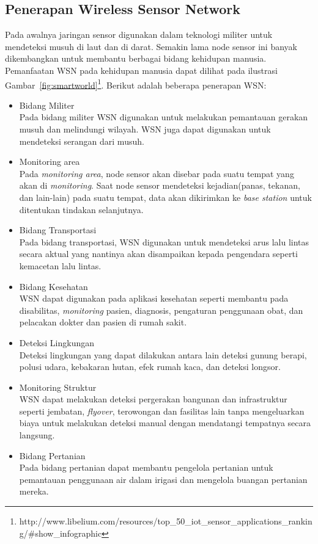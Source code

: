 \subsection{Penerapan Wireless Sensor Network \cite{handbook}}
Pada awalnya jaringan sensor digunakan dalam teknologi militer untuk mendeteksi musuh di laut dan di darat. Semakin lama node sensor ini banyak dikembangkan untuk membantu berbagai bidang kehidupan manusia. Pemanfaatan WSN pada kehidupan manusia dapat dilihat pada ilustrasi Gambar~\ref{fig:smartworld}\footnote{http://www.libelium.com/resources/top\_50\_iot\_sensor\_applications\_ranking/\#show\_infographic}. Berikut adalah beberapa penerapan WSN:
\begin{itemize}
\item Bidang Militer\\
Pada bidang militer WSN digunakan untuk melakukan pemantauan gerakan musuh dan melindungi wilayah. WSN juga dapat digunakan untuk mendeteksi serangan dari musuh.

\item Monitoring area\\
Pada \textit{monitoring area}, node sensor akan disebar pada suatu tempat yang akan di \textit{monitoring}. Saat node sensor mendeteksi kejadian(panas, tekanan, dan lain-lain) pada suatu tempat, data akan dikirimkan ke \textit{base station} untuk ditentukan tindakan selanjutnya.

\item Bidang Transportasi\\
Pada bidang transportasi, WSN digunakan untuk mendeteksi arus lalu lintas secara aktual yang nantinya akan disampaikan kepada pengendara seperti kemacetan lalu lintas. 

\item Bidang Kesehatan\\
WSN dapat digunakan pada aplikasi kesehatan seperti membantu pada disabilitas, \textit{monitoring} pasien, diagnosis, pengaturan penggunaan obat, dan pelacakan dokter dan pasien di rumah sakit.

\item Deteksi Lingkungan\\
Deteksi lingkungan yang dapat dilakukan antara lain deteksi gunung berapi, polusi udara, kebakaran hutan, efek rumah kaca, dan deteksi longsor.

\item Monitoring Struktur\\
WSN dapat melakukan deteksi pergerakan bangunan dan infrastruktur seperti jembatan, \textit{flyover}, terowongan dan fasilitas lain tanpa mengeluarkan biaya untuk melakukan deteksi manual dengan mendatangi tempatnya secara langsung.

\item Bidang Pertanian\\
Pada bidang pertanian dapat membantu pengelola pertanian untuk pemantauan penggunaan air dalam irigasi dan mengelola buangan pertanian mereka.
\end{itemize}

